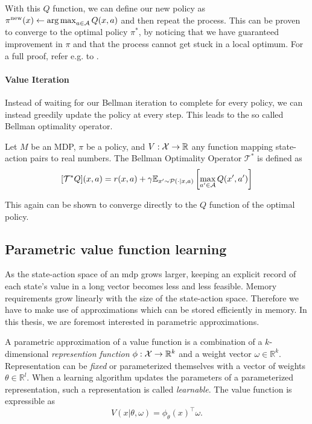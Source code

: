 With this $Q$ function, we can define our new policy as $\pi^\mathrm{new}(x) \leftarrow \operatorname*{arg\,max}_{a\in\mathcal{A}} Q(x,a)$ and then repeat the process.
This can be proven to converge to the optimal policy $\pi^*$, by noticing that we have guaranteed improvement in $\pi$ and that the process cannot get stuck in a local optimum.
For a full proof, refer e.g. to .

\paragraph{Value Iteration}

Instead of waiting for our Bellman iteration to complete for every policy, we can instead greedily update the policy at every step.
This leads to the so called Bellman optimality operator.

\begin{definition}
    Let $M$ be an MDP, $\pi$ be a policy, and $V: \mathcal{X} \rightarrow \mathbb{R}$ any function mapping state-action pairs to real numbers.
    The Bellman Optimality Operator $\mathcal{T}^*$ is defined as
    $$[\mathcal{T}^* Q](x,a) = r(x,a) + \gamma \mathbb{E}_{x'\sim \mathcal{P}(\cdot|x,a)}\left[\max_{a' \in \mathcal{A}}Q(x',a')\right]$$
\end{definition}

This again can be shown to converge directly to the $Q$ function of the optimal policy.

\subsection{Parametric value function learning}

As the state-action space of an \ac{mdp} grows larger, keeping an explicit record of each state's value in a long vector becomes less and less feasible.
Memory requirements grow linearly with the size of the state-action space.
Therefore we have to make use of approximations which can be stored efficiently in memory.
In this thesis, we are foremost interested in parametric approximations.

\begin{definition}
    A parametric approximation of a value function is a combination of a $k$-dimensional \emph{represention function} $\phi: \mathcal{X} \rightarrow \mathbb{R}^k$ and a weight vector $\omega \in \mathbb{R}^k$.
    Representation can be \emph{fixed} or parameterized themselves with a vector of weights $\theta \in \mathbb{R}^l$.
    When a learning algorithm updates the parameters of a parameterized representation, such a representation is called \emph{learnable}.
    The value function is expressible as
    $$V(x|\theta,\omega) = \phi_\theta(x)^\top \omega.$$
\end{definition}

